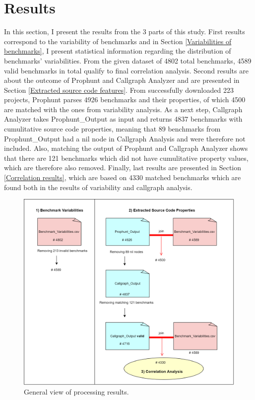 \documentclass{seal_thesis}
\begin{document}
\chapter{Results}
\label{Results}
In this section, I present the results from the 3 parts of this study. First results correspond to the variability of benchmarks and in Section \ref{Variabilities of benchmarks}, I present statistical information regarding the distribution of benchmarks' variabilities. From the given dataset of 4802 total benchmarks, 4589 valid benchmarks in total qualify to final correlation analysis. Second results are about the outcome of Prophunt and Callgraph Analyzer and are presented in Section \ref{Extracted source code features}. From successfully downloaded 223 projects, Prophunt parses 4926 benchmarks and their properties, of which 4500 are matched with the ones from variability analysis. As a next step, Callgraph Analyzer takes Prophunt\_Output as input and returns 4837 benchmarks with cumulitative source code properties, meaning that 89 benchmarks from Prophunt\_Output had a nil node in Callgraph Analysis and were therefore not included. Also, matching the output of Prophunt and Callgraph Analyzer shows that there are 121 benchmarks which did not have cumulitative property values, which are therefore also removed. Finally, last results are presented in Section \ref{Correlation results}, which are based on 4330 matched benchmarks which are found both in the results of variability and callgraph analysis.

\begin{figure}[H]
	\centering
	\includegraphics[width=\linewidth]{ResultsGeneral}
	\caption{General view of processing results.}
	\label{fig:results}
\end{figure}
\end{document}

